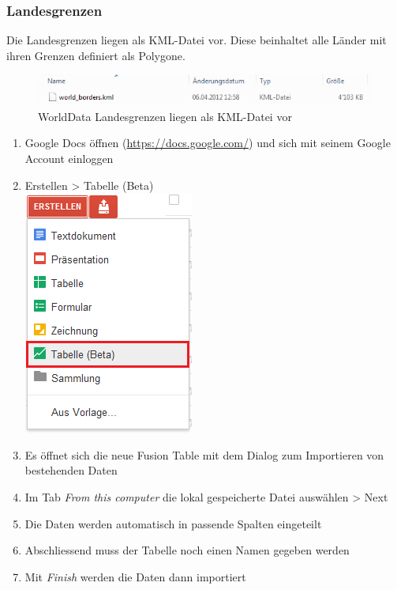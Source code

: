 \subsubsection{Landesgrenzen}
\label{Landesgrenzen}
Die Landesgrenzen liegen als KML-Datei vor. Diese beinhaltet alle Länder mit ihren Grenzen definiert als Polygone.

\begin{figure}[!h]
	\centering
	\includegraphics{images/usecase1-worlddata/documentation/worlddata-worldborders_kml.png}
	\caption{WorldData Landesgrenzen liegen als KML-Datei vor}
	\label{worlddata-worldborders_kml}
\end{figure}

\begin{enumerate}
\item Google Docs öffnen (\url{https://docs.google.com/}) und sich mit seinem Google Account einloggen
\item Erstellen > Tabelle (Beta) \\ \includegraphics{images/usecase1-worlddata/documentation/worlddata-worldborders_import1.png}
\item Es öffnet sich die neue Fusion Table mit dem Dialog zum Importieren von bestehenden Daten
\item Im Tab \emph{From this computer} die lokal gespeicherte Datei auswählen > Next
\item Die Daten werden automatisch in passende Spalten eingeteilt
\item Abschliessend muss der Tabelle noch einen Namen gegeben werden
\item Mit \emph{Finish} werden die Daten dann importiert
\end{enumerate}


